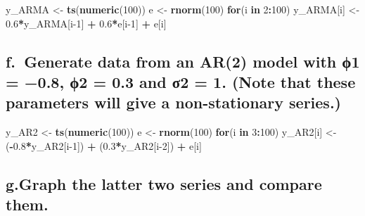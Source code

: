 \documentclass[]{article}
\newenvironment{Shaded}{\begin{snugshade}}{\end{snugshade}}
\newcommand{\ControlFlowTok}[1]{\textcolor[rgb]{0.13,0.29,0.53}{\textbf{#1}}}
\newcommand{\DecValTok}[1]{\textcolor[rgb]{0.00,0.00,0.81}{#1}}
\newcommand{\FloatTok}[1]{\textcolor[rgb]{0.00,0.00,0.81}{#1}}
\newcommand{\KeywordTok}[1]{\textcolor[rgb]{0.13,0.29,0.53}{\textbf{#1}}}
\newcommand{\NormalTok}[1]{#1}
\newcommand{\OperatorTok}[1]{\textcolor[rgb]{0.81,0.36,0.00}{\textbf{#1}}}
\newcommand{\StringTok}[1]{\textcolor[rgb]{0.31,0.60,0.02}{#1}}
\begin{document}
\begin{Shaded}
\begin{Highlighting}[]
\NormalTok{y_ARMA <-}\StringTok{ }\KeywordTok{ts}\NormalTok{(}\KeywordTok{numeric}\NormalTok{(}\DecValTok{100}\NormalTok{))}
\NormalTok{e <-}\StringTok{ }\KeywordTok{rnorm}\NormalTok{(}\DecValTok{100}\NormalTok{)}
\ControlFlowTok{for}\NormalTok{(i }\ControlFlowTok{in} \DecValTok{2}\OperatorTok{:}\DecValTok{100}\NormalTok{)}
\NormalTok{  y_ARMA[i] <-}\StringTok{ }\FloatTok{0.6}\OperatorTok{*}\NormalTok{y_ARMA[i}\DecValTok{-1}\NormalTok{] }\OperatorTok{+}\StringTok{ }\FloatTok{0.6}\OperatorTok{*}\NormalTok{e[i}\DecValTok{-1}\NormalTok{] }\OperatorTok{+}\StringTok{ }\NormalTok{e[i]}
\end{Highlighting}
\end{Shaded}

\hypertarget{f.-generate-data-from-an-ar2-model-with-1-0.8-2-0.3-and-2-1.-note-that-these-parameters-will-give-a-non-stationary-series.}{%
\subsection{f.~Generate data from an AR(2) model with ϕ1 = −0.8, ϕ2 =
0.3 and σ2 = 1. (Note that these parameters will give a non-stationary
series.)}\label{f.-generate-data-from-an-ar2-model-with-1-0.8-2-0.3-and-2-1.-note-that-these-parameters-will-give-a-non-stationary-series.}}

\begin{Shaded}
\begin{Highlighting}[]
\NormalTok{y_AR2 <-}\StringTok{ }\KeywordTok{ts}\NormalTok{(}\KeywordTok{numeric}\NormalTok{(}\DecValTok{100}\NormalTok{))}
\NormalTok{e <-}\StringTok{ }\KeywordTok{rnorm}\NormalTok{(}\DecValTok{100}\NormalTok{)}
\ControlFlowTok{for}\NormalTok{(i }\ControlFlowTok{in} \DecValTok{3}\OperatorTok{:}\DecValTok{100}\NormalTok{)}
\NormalTok{  y_AR2[i] <-}\StringTok{ }\NormalTok{(}\OperatorTok{-}\FloatTok{0.8}\OperatorTok{*}\NormalTok{y_AR2[i}\DecValTok{-1}\NormalTok{]) }\OperatorTok{+}\StringTok{ }\NormalTok{(}\FloatTok{0.3}\OperatorTok{*}\NormalTok{y_AR2[i}\DecValTok{-2}\NormalTok{]) }\OperatorTok{+}\StringTok{ }\NormalTok{e[i]}
\end{Highlighting}
\end{Shaded}

\hypertarget{g.graph-the-latter-two-series-and-compare-them.}{%
\subsection{g.Graph the latter two series and compare
them.}\label{g.graph-the-latter-two-series-and-compare-them.}}
\end{document}
